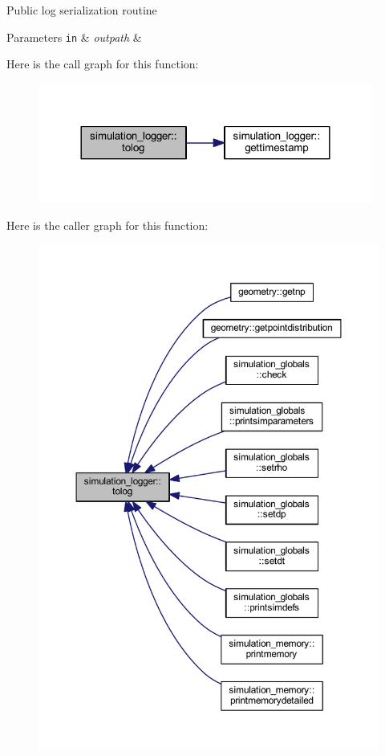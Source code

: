 Public log serialization routine 
\begin{DoxyParams}[1]{Parameters}
\mbox{\tt in}  & {\em outpath} & \\
\hline
\end{DoxyParams}
Here is the call graph for this function\+:\nopagebreak
\begin{figure}[H]
\begin{center}
\leavevmode
\includegraphics[width=312pt]{namespacesimulation__logger_a3aaa69ec168b6f34d703fb4033a22d92_cgraph}
\end{center}
\end{figure}
Here is the caller graph for this function\+:\nopagebreak
\begin{figure}[H]
\begin{center}
\leavevmode
\includegraphics[width=350pt]{namespacesimulation__logger_a3aaa69ec168b6f34d703fb4033a22d92_icgraph}
\end{center}
\end{figure}


